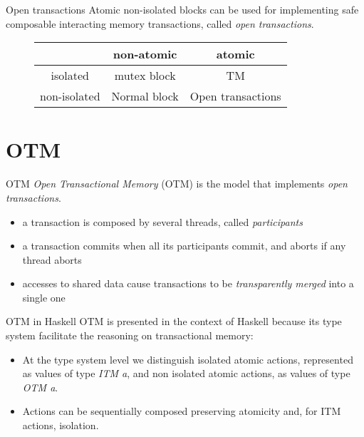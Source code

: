 \documentclass[beamer={noamsthm,10pt},target=bach]{thud}[2014/03/11]
\begin{document}
\begin{frame}[fragile]{Open transactions}
Atomic non-isolated blocks can be used for implementing safe composable interacting memory transactions, called \emph{open transactions}.


\begin{figure}
\centering

\begin{tabular}{ c | c | c |}
\cline{2-3}
& non-atomic & atomic \\
\hline
\multicolumn{1}{|c|}{isolated} & mutex block & TM\\
\hline
\multicolumn{1}{|c|}{non-isolated} & Normal block & Open transactions\\
\hline
\end{tabular}
\end{figure}

\end{frame}

\section{OTM}

\begin{frame}{OTM}
\emph{Open Transactional Memory} (OTM) is the model that implements \emph{open transactions}. 
\begin{itemize}
\item<2-> a transaction is composed by several threads, called \emph{participants}
\item<3-> a transaction commits when all its participants commit, and aborts if any thread aborts
\item<4-> accesses to shared data cause transactions to be \emph{transparently merged} into a single one
\end{itemize}
\end{frame}

\begin{frame}{OTM in Haskell}
OTM is presented in the context of Haskell because its type system facilitate the reasoning on transactional memory:
\begin{itemize}
\item At the type system level we distinguish isolated atomic actions, represented as values of type \emph{ITM a}, and non isolated atomic actions, as values of type \emph{OTM a}.
\item Actions can be sequentially composed preserving atomicity and, for ITM actions, isolation.
\end{itemize}
\end{frame}
\end{document}
